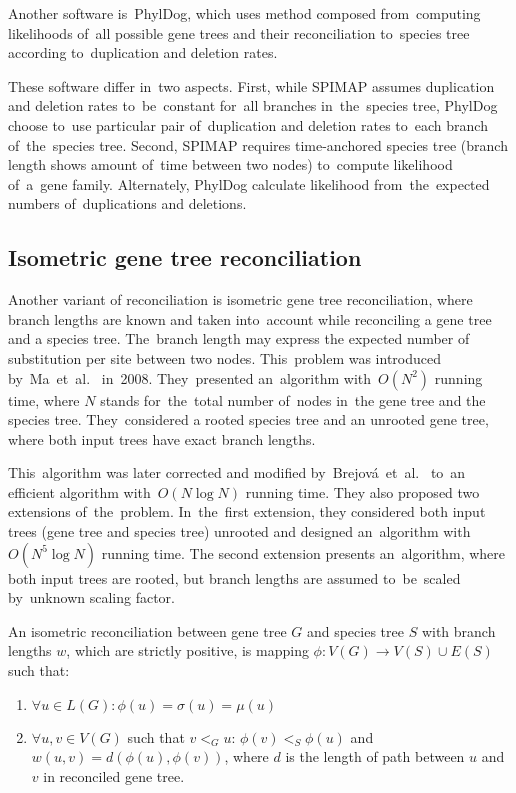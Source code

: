 Another software is~PhylDog\cite{phyldog}, which uses method composed from~computing likelihoods of~all possible gene trees and their reconciliation to~species tree according to~duplication and deletion rates.

These software differ in~two aspects. First, while SPIMAP assumes duplication and deletion rates to~be~constant for~all branches in~the~species tree, PhylDog choose to~use particular pair of~duplication and deletion rates to~each branch of~the~species tree. Second, SPIMAP requires time-anchored species tree (branch length shows amount of~time between two nodes) to~compute likelihood of~a~gene family. Alternately, PhylDog calculate likelihood from~the~expected numbers of~duplications and deletions. 


\subsection{Isometric gene tree reconciliation}
Another variant of reconciliation is isometric gene tree reconciliation, where branch lengths are known and taken into~account while reconciling a gene tree and a species tree. The~branch length may express the expected number of substitution per site between two nodes. This~problem was introduced by~Ma~et~al.~\cite{ma} in~2008. They~presented an~algorithm with~$O(N^2)$ running time, where $N$ stands for~the~total number of~nodes in~the gene tree and the species tree. They~considered a rooted species tree and an unrooted gene tree, where both input trees have exact branch lengths.

This~algorithm was later corrected and modified by~Brejová~et~al.~\cite{brejova} to~an efficient algorithm with~$O(N \log N)$ running time. They also proposed two extensions of~the~problem. In~the~first extension, they considered both input trees (gene tree and species tree) unrooted and designed an~algorithm with~$O(N^5 \log N)$ running time. The second extension presents an~algorithm, where both input trees are rooted, but branch lengths are assumed to~be~scaled by~unknown scaling factor.

\begin{definition}
An isometric reconciliation between gene tree $G$ and species tree $S$ with branch lengths $w$, which are strictly positive, is mapping $\phi: V(G) \rightarrow V(S) \cup E(S)$ such that:
	\begin{enumerate}\itemsep0em
	\item $\forall u \in L(G): \phi(u) = \sigma(u) = \mu(u)$
	\item $\forall u, v \in V(G)$ such that $v<_Gu$: $\phi(v)<_S\phi(u)$ and $w(u, v) = d(\phi(u), \phi(v))$, where $d$ is the length of path between $u$ and $v$ in reconciled gene tree.
	\end{enumerate}
\end{definition}

